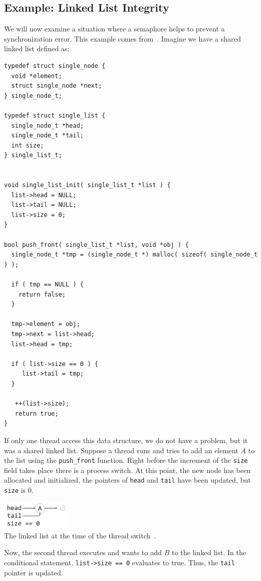 \subsection*{Example: Linked List Integrity}
We will now examine a situation where a semaphore helps to prevent a synchronization error. This example comes from~\cite{mte241}. Imagine we have a shared linked list defined as:

\begin{verbatim}
typedef struct single_node {
  void *element;
  struct single_node *next;
} single_node_t;

typedef struct single_list {
  single_node_t *head;
  single_node_t *tail;
  int size;
} single_list_t;


void single_list_init( single_list_t *list ) {
  list->head = NULL;
  list->tail = NULL;
  list->size = 0;
}

bool push_front( single_list_t *list, void *obj ) {
  single_node_t *tmp = (single_node_t *) malloc( sizeof( single_node_t ) );
  
  if ( tmp == NULL ) {
    return false;
  }
  
  tmp->element = obj;
  tmp->next = list->head;
  list->head = tmp;

  if ( list->size == 0 ) {
     list->tail = tmp;
  }
  
   ++(list->size);
   return true;
}
\end{verbatim}

If only one thread access this data structure, we do not have a problem, but it was a shared linked list. Suppose a thread runs and tries to add an element $A$ to the list using the \texttt{push\_front} function. Right before the increment of the \texttt{size} field takes place there is a process switch. At this point, the new node has been allocated and initialized, the pointers of \texttt{head} and \texttt{tail} have been updated, but \texttt{size} is 0. 

\begin{center}
\includegraphics[width=0.25\textwidth]{images/linkedlist1.png}\\
The linked list at the time of the thread switch~\cite{mte241}.
\end{center}

Now, the second thread executes and wants to add $B$ to the linked list. In the conditional statement, \texttt{list->size == 0} evaluates to true. Thus, the \texttt{tail} pointer is updated.

